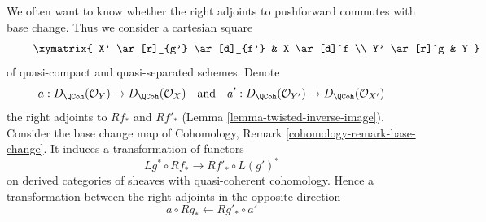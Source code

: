 \medskip\noindent
We often want to know whether the right adjoints to pushforward commutes
with base change. Thus we consider a cartesian square
\begin{equation}
\label{equation-base-change}
\vcenter{
\xymatrix{
X' \ar[r]_{g'} \ar[d]_{f'} & X \ar[d]^f \\
Y' \ar[r]^g & Y
}
}
\end{equation}
of quasi-compact and quasi-separated schemes.
Denote
$$
a  : D_\QCoh(\mathcal{O}_Y) \to D_\QCoh(\mathcal{O}_X)
\quad\text{and}\quad
a'  : D_\QCoh(\mathcal{O}_{Y'}) \to D_\QCoh(\mathcal{O}_{X'})
$$
the right adjoints to $Rf_*$ and $Rf'_*$
(Lemma \ref{lemma-twisted-inverse-image}).
Consider the base change map of
Cohomology, Remark \ref{cohomology-remark-base-change}.
It induces a transformation of functors
$$
Lg^* \circ Rf_* \longrightarrow Rf'_* \circ L(g')^*
$$
on derived categories of sheaves with quasi-coherent cohomology.
Hence a transformation between the right adjoints in the opposite direction
$$
a \circ Rg_* \longleftarrow Rg'_* \circ a'
$$